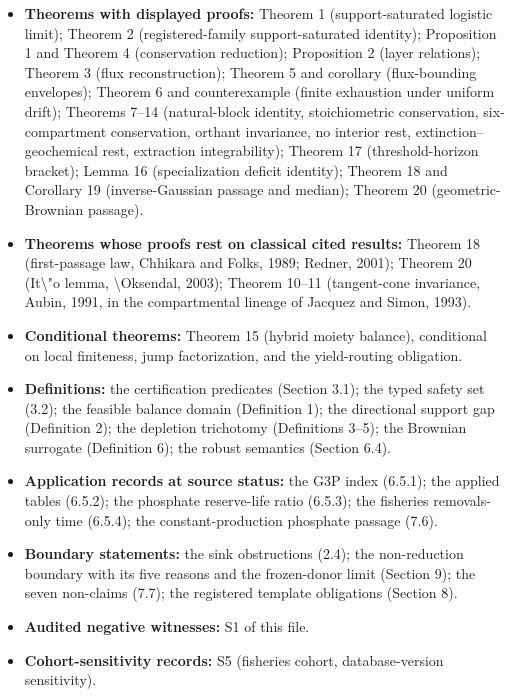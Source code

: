 \documentclass[11pt]{article}
\begin{document}
\begin{itemize}\setlength{\itemsep}{2pt}
\item \textbf{Theorems with displayed proofs:} Theorem 1 (support-saturated logistic limit); Theorem 2 (registered-family support-saturated identity); Proposition 1 and Theorem 4 (conservation reduction); Proposition 2 (layer relations); Theorem 3 (flux reconstruction); Theorem 5 and corollary (flux-bounding envelopes); Theorem 6 and counterexample (finite exhaustion under uniform drift); Theorems 7--14 (natural-block identity, stoichiometric conservation, six-compartment conservation, orthant invariance, no interior rest, extinction--geochemical rest, extraction integrability); Theorem 17 (threshold-horizon bracket); Lemma 16 (specialization deficit identity); Theorem 18 and Corollary 19 (inverse-Gaussian passage and median); Theorem 20 (geometric-Brownian passage).
\item \textbf{Theorems whose proofs rest on classical cited results:} Theorem 18 (first-passage law, Chhikara and Folks, 1989; Redner, 2001); Theorem 20 (It\textbackslash{}"o lemma, \textbackslash{}O{}ksendal, 2003); Theorem 10--11 (tangent-cone invariance, Aubin, 1991, in the compartmental lineage of Jacquez and Simon, 1993).
\item \textbf{Conditional theorems:} Theorem 15 (hybrid moiety balance), conditional on local finiteness, jump factorization, and the yield-routing obligation.
\item \textbf{Definitions:} the certification predicates (Section 3.1); the typed safety set (3.2); the feasible balance domain (Definition 1); the directional support gap (Definition 2); the depletion trichotomy (Definitions 3--5); the Brownian surrogate (Definition 6); the robust semantics (Section 6.4).
\item \textbf{Application records at source status:} the G3P index (6.5.1); the applied tables (6.5.2); the phosphate reserve-life ratio (6.5.3); the fisheries removals-only time (6.5.4); the constant-production phosphate passage (7.6).
\item \textbf{Boundary statements:} the sink obstructions (2.4); the non-reduction boundary with its five reasons and the frozen-donor limit (Section 9); the seven non-claims (7.7); the registered template obligations (Section 8).
\item \textbf{Audited negative witnesses:} S1 of this file.
\item \textbf{Cohort-sensitivity records:} S5 (fisheries cohort, database-version sensitivity).
\end{itemize}
\end{document}
